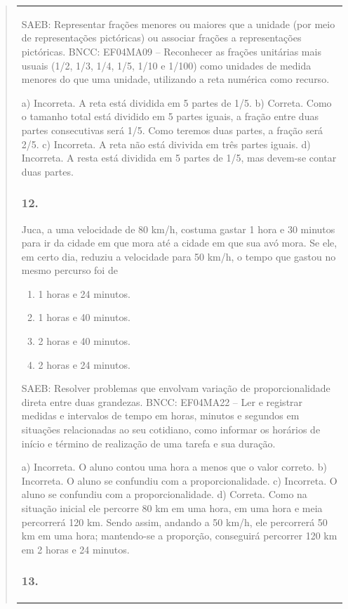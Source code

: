 \begin{mdframed}[linewidth=2pt,linecolor=salmao,roundcorner=2pt]
\begin{itemize}
{\begin{itemize}
\begin{escolha}
{\begin{quote}
{\begin{escolha}
{{{{{\begin{longtable}[]{@{}l@{}}
\begin{itemize}
{SAEB: Representar frações menores ou maiores que a unidade
(por meio de representações pictóricas) ou associar frações a
representações pictóricas.
BNCC: EF04MA09 -- Reconhecer as frações unitárias mais usuais (1/2, 1/3, 1/4, 1/5, 1/10 e 1/100) como
unidades de medida menores do que uma unidade, utilizando a reta numérica como recurso.

a) Incorreta. A reta está dividida em 5 partes de 1/5.
b) Correta. Como o tamanho total está dividido em 5 partes iguais, a fração entre
duas partes consecutivas será 1/5. Como teremos duas partes, a fração
será 2/5.
c) Incorreta. A reta não está divivida em três partes iguais.
d) Incorreta. A resta está dividida em 5 partes de 1/5, mas devem-se contar duas partes.

\subsubsection{12.}

Juca, a uma velocidade de 80 km/h, costuma gastar 1 hora e 30 minutos
para ir da cidade em que mora até a cidade em que sua avó mora. Se ele,
em certo dia, reduziu a velocidade para 50 km/h, o tempo que gastou no mesmo percurso foi de

\begin{enumerate}
\item
  1 horas e 24 minutos.
\item
  1 horas e 40 minutos.
\item
  2 horas e 40 minutos.
\item
  2 horas e 24 minutos.
\end{enumerate}

SAEB: Resolver problemas que envolvam variação de
proporcionalidade direta entre duas grandezas.
BNCC: EF04MA22 -- Ler e registrar medidas e intervalos de tempo em horas, minutos e segundos em
situações relacionadas ao seu cotidiano, como informar os horários de início e término de realização
de uma tarefa e sua duração.

a) Incorreta. O aluno contou uma hora a menos que o valor correto.
b) Incorreta. O aluno se confundiu com a proporcionalidade.
c) Incorreta. O aluno se confundiu com a proporcionalidade.
d) Correta. Como na situação inicial ele percorre 80 km em uma hora, em uma hora e
meia percorrerá 120 km. Sendo assim, andando a 50 km/h, ele percorrerá 50 km em uma hora;
mantendo-se a proporção, conseguirá percorrer 120 km em 2 horas e 24
minutos.

\subsubsection{13. }

}
\end{itemize}
\end{longtable}}}}}}
\end{escolha}}
\end{quote}}
\end{escolha}
\end{itemize}}
\end{itemize}
\end{mdframed}
